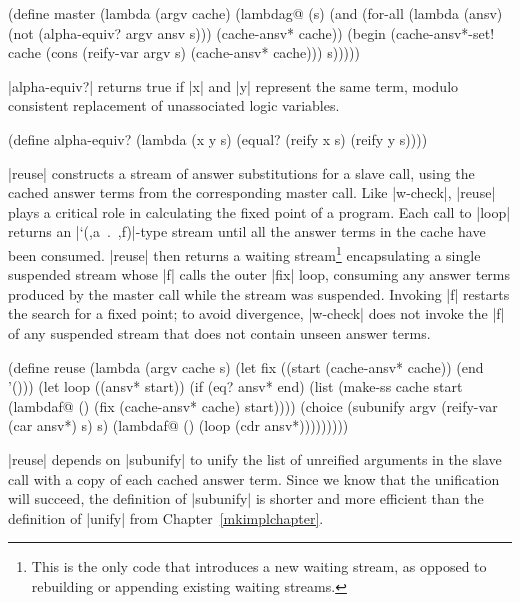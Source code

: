 \schemedisplayspace
\begin{schemedisplay}
(define master
  (lambda (argv cache)
    (lambdag@ (s)
      (and
        (for-all
          (lambda (ansv) (not (alpha-equiv? argv ansv s)))
          (cache-ansv* cache))
        (begin
          (cache-ansv*-set! cache (cons (reify-var argv s) (cache-ansv* cache)))
          s)))))
\end{schemedisplay}

\scheme|alpha-equiv?| returns true if \scheme|x| and \scheme|y|
represent the same term, modulo consistent replacement of unassociated
logic variables.

\schemedisplayspace
\begin{schemedisplay}
(define alpha-equiv?
  (lambda (x y s)
    (equal? (reify x s) (reify y s))))
\end{schemedisplay}

\scheme|reuse| constructs a stream of answer substitutions for a slave
call, using the cached answer terms from the corresponding master
call.  Like \scheme|w-check|, \scheme|reuse| plays a critical role in
calculating the fixed point of a program.  Each call to \scheme|loop|
returns an \mbox{\scheme|`(,a . ,f)|}-type stream until all the answer
terms in the cache have been consumed.  \scheme|reuse| then returns a
waiting stream\footnote{This is the only code that introduces a new
  waiting stream, as opposed to rebuilding or appending existing
  waiting streams.} encapsulating a single suspended stream whose
\scheme|f| calls the outer \scheme|fix| loop, consuming any answer
terms produced by the master call while the stream was suspended.
Invoking \scheme|f| restarts the search for a fixed point; to avoid
divergence, \scheme|w-check| does not invoke the \scheme|f| of any
suspended stream that does not contain unseen answer terms.

\schemedisplayspace
\begin{schemedisplay}
(define reuse
  (lambda (argv cache s)
    (let fix ((start (cache-ansv* cache)) (end '()))
      (let loop ((ansv* start))
        (if (eq? ansv* end)
            (list (make-ss cache start (lambdaf@ () (fix (cache-ansv* cache) start))))
            (choice (subunify argv (reify-var (car ansv*) s) s)
                    (lambdaf@ () (loop (cdr ansv*)))))))))
\end{schemedisplay}

\scheme|reuse| depends on \scheme|subunify| to unify the list of
unreified arguments in the slave call with a copy of each cached
answer term.  Since we know that the unification will succeed, the
definition of \scheme|subunify| is shorter and more efficient than the
definition of \scheme|unify| from Chapter~\ref{mkimplchapter}.

